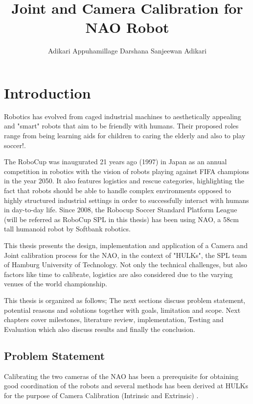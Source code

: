 \documentclass[english, printversion, nomenclature, notitle]{tuvisionthesis} %
\author{Adikari Appuhamillage Darshana Sanjeewan Adikari}
\title{Joint and Camera Calibration for NAO Robot}
\begin{document}
%
\hypersetup{
	pdfauthor=\@author\relax,
	pdftitle=\@title\relax
}
\tuvisionheading
\hypersetup{pageanchor=true}
\clearpage{\thispagestyle{empty}\cleardoublepage}

\chapter{Introduction}

Robotics has evolved from caged industrial machines to aesthetically appealing and "smart" robots that aim to be friendly with humans. Their proposed roles range from being learning aids for children to caring the elderly and also to play soccer!.

The RoboCup was inaugurated 21 years ago (1997) in Japan as an annual competition in robotics with the vision of robots playing against FIFA champions in the year 2050. It also features  logistics and rescue categories, highlighting  the fact that robots should be able to handle complex environments opposed to highly structured industrial settings in order to successfully interact with humans in day-to-day life.  Since 2008, the Robocup Soccer Standard Platform League (will be referred as RoboCup SPL in this thesis) has been using NAO, a 58cm tall humanoid robot by Softbank robotics.

This thesis presents the design, implementation and application of a Camera and Joint calibration process for the NAO, in the context of "HULKs", the SPL team of Hamburg University of Technology. Not only the technical challenges, but also factors like time to calibrate, logistics are also considered due to the varying venues of the world championship.

This thesis is organized as follows; The next sections discuss problem statement, potential reasons and solutions together with goals, limitation and scope. Next chapters cover milestones, literature review, implementation, Testing and Evaluation which also discuss results and finally the conclusion.

\section{Problem Statement}

Calibrating the two cameras of the NAO has been a prerequisite for obtaining good coordination of the robots and several methods has been derived at HULKs for the purpose of Camera Calibration (Intrinsic and Extrinsic) \cite{darshana_adikari_team_2017}.
\end{document}
